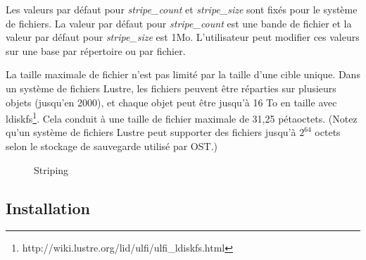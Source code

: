 \documentclass[12pt]{article}
\begin{document}
Les valeurs par défaut pour \textit{stripe\_count} et \textit{stripe\_size} sont fixés pour le système de fichiers. La valeur par défaut pour \textit{stripe\_count} est une bande de fichier et la valeur par défaut pour \textit{stripe\_size} est 1Mo. L'utilisateur peut modifier ces valeurs sur une base par répertoire ou par fichier.

La taille maximale de fichier n'est pas limité par la taille d'une cible unique. Dans un système de fichiers Lustre, les fichiers peuvent être réparties sur plusieurs objets (jusqu'en 2000), et chaque objet peut être jusqu'à 16 To en taille avec ldiskfs\footnote{http://wiki.lustre.org/lid/ulfi/ulfi\_ldiskfs.html}. Cela conduit à une taille de fichier maximale de 31,25 pétaoctets. (Notez qu'un système de fichiers Lustre peut supporter des fichiers jusqu'à \begin{math}2^{64}\end{math} octets selon le stockage de sauvegarde utilisé par OST.)

\begin{figure}[H]
\caption{Striping}
\label{fig:identification}
\end{figure}


\newpage
\subsection{Installation}
\end{document}
